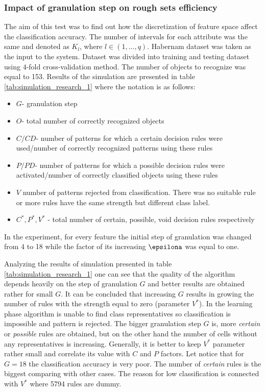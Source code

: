 \subsubsection{Impact of granulation step on rough sets efficiency}
\label{cha:Simulation_reaearch_1}
The aim of this test was to find out how the discretization of feature space
affect the classification accuracy. The number of intervals for each
attribute was the same and denoted as $K_l$, where $l \in (1, \ldots, q)$.
Habernam dataset was taken as the input to the system. Dataset was divided into
training and testing dataset using $4$-fold cross-validation method. The number
of objects to recognize was equal to 153.
Results of the simulation are presented in table
\ref{tab:simulation_research_1} where the notation is as follows:
\begin{itemize}
    \item $G$- granulation step
    \item $O$- total number of correctly recognized objects
    \item $C/CD$- number of patterns for which a certain decision rules were
        used/number of correctly recognized patterns using these rules 
    \item $P/PD$- number of patterns for which a possible decision rules were
        activated/number of correctly classified objects using these rules
    \item $V$ number of patterns rejected from classification. There was no
        suitable rule or more rules have the same strength but different class
        label.
    \item $C^*, P^*, V^*$ - total number of certain, possible, void decision rules 
        respectively
\end{itemize}
In the experiment, for every feature the initial step of granulation was
changed from 4 to 18 while the factor of its increasing $\epsilona$  was equal 
to one.

Analyzing the results of simulation presented in table \ref{tab:simulation_research_1}
one can see that the quality of the algorithm depends heavily on the step of
granulation $G$ and better results are obtained rather for small $G$.
It can be concluded that increasing $G$ results in growing the number of rules
with the strength equal to zero (parameter $V^*$). In the learning phase
algorithm is unable to find class representatives so classification is 
impossible and pattern is rejected. The bigger granulation step $G$ is, more
\textit{certain} or \textit{possible} rules are obtained, but on the other hand
the number of cells without any representatives is increasing. Generally, it is
better to keep $V^*$ parameter rather small and correlate its value with $C$
and $P$ factors. Let notice that for $G=18$ the classification accuracy is very
poor. The number of \textit{certain} rules is the biggest comparing with other
cases. The reason for low classification is connected with $V^*$ where 5794
rules are dummy.

